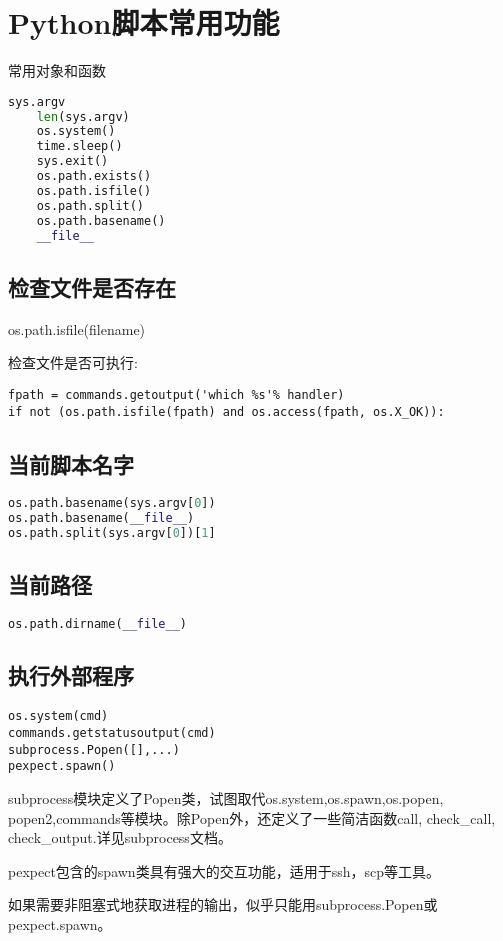 \section{Python脚本常用功能}
常用对象和函数
\begin{lstlisting}[language=Python]
    sys.argv
    len(sys.argv)
    os.system()
    time.sleep()
    sys.exit()
    os.path.exists()
    os.path.isfile()
    os.path.split()
    os.path.basename()
    __file__
\end{lstlisting}

\subsection{检查文件是否存在}
os.path.isfile(filename)

检查文件是否可执行:
\begin{verbatim}
fpath = commands.getoutput('which %s'% handler)
if not (os.path.isfile(fpath) and os.access(fpath, os.X_OK)):
\end{verbatim}
\subsection{当前脚本名字}
\begin{lstlisting}[language=Python]
os.path.basename(sys.argv[0])
os.path.basename(__file__)
os.path.split(sys.argv[0])[1]
\end{lstlisting}

\subsection{当前路径}
\begin{lstlisting}[language=Python]
    os.path.dirname(__file__)
\end{lstlisting}

\subsection{执行外部程序}
\begin{verbatim}
os.system(cmd)
commands.getstatusoutput(cmd)
subprocess.Popen([],...)
pexpect.spawn()
\end{verbatim}
subprocess模块定义了Popen类，试图取代os.system,os.spawn,os.popen, popen2,commands等模块。除Popen外，还定义了一些简洁函数call, check\_call, check\_output.详见subprocess文档。

pexpect包含的spawn类具有强大的交互功能，适用于ssh，scp等工具。

如果需要非阻塞式地获取进程的输出，似乎只能用subprocess.Popen或pexpect.spawn。

